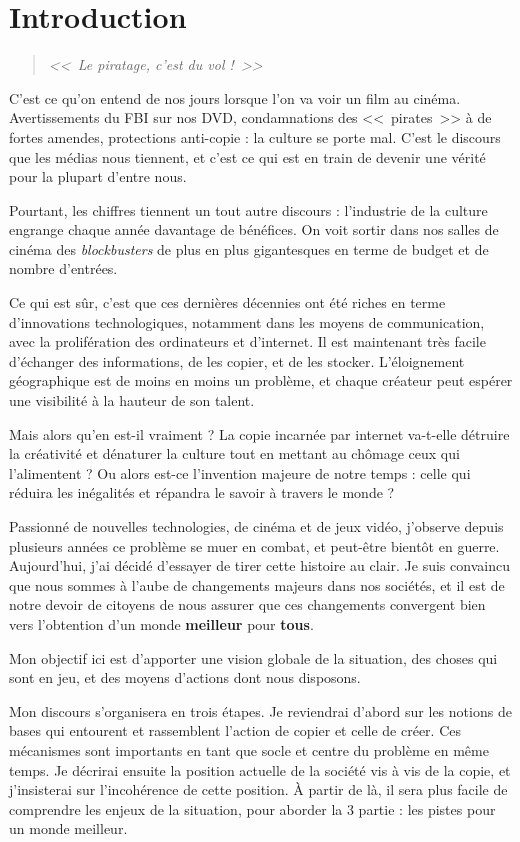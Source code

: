 \chapter*{Introduction}

\begin{quote}
{\Large \textit{<<~Le piratage, c'est du vol !~>>}}
\end{quote}

C'est ce qu'on entend de nos jours lorsque l'on va voir un film au cinéma. Avertissements du FBI sur nos DVD, condamnations des <<~pirates~>> à de fortes amendes, protections anti-copie : la culture se porte mal. C'est le discours que les médias nous tiennent, et c'est ce qui est en train de devenir une vérité pour la plupart d'entre nous.

Pourtant, les chiffres tiennent un tout autre discours : l'industrie de la culture engrange chaque année davantage de bénéfices. On voit sortir dans nos salles de cinéma des \textit{blockbusters} de plus en plus gigantesques en terme de budget et de nombre d'entrées.

Ce qui est sûr, c'est que ces dernières décennies ont été riches en terme d'innovations technologiques, notamment dans les moyens de communication, avec la prolifération des ordinateurs et d'internet. Il est maintenant très facile d'échanger des informations, de les copier, et de les stocker. L'éloignement géographique est de moins en moins un problème, et chaque créateur peut espérer une visibilité à la hauteur de son talent.

Mais alors qu'en est-il vraiment ? La copie incarnée par internet va-t-elle détruire la créativité et dénaturer la culture tout en mettant au chômage ceux qui l'alimentent ? Ou alors est-ce l'invention majeure de notre temps : celle qui réduira les inégalités et répandra le savoir à travers le monde ?

Passionné de nouvelles technologies, de cinéma et de jeux vidéo, j'observe depuis plusieurs années ce problème se muer en combat, et peut-être bientôt en guerre. Aujourd'hui, j'ai décidé d'essayer de tirer cette histoire au clair. Je suis convaincu que nous sommes à l'aube de changements majeurs dans nos sociétés, et il est de notre devoir de citoyens de nous assurer que ces changements convergent bien vers l'obtention d'un monde \textbf{meilleur} pour \textbf{tous}.

Mon objectif ici est d'apporter une vision globale de la situation, des choses qui sont en jeu, et des moyens d'actions dont nous disposons.

Mon discours s'organisera en trois étapes. Je reviendrai d'abord sur les notions de bases qui entourent et rassemblent l'action de copier et celle de créer. Ces mécanismes sont importants en tant que socle et centre du problème en même temps. Je décrirai ensuite la position actuelle de la société vis à vis de la copie, et j'insisterai sur l'incohérence de cette position. À partir de là, il sera plus facile de comprendre les enjeux de la situation, pour aborder la 3\ieme{} partie : les pistes pour un monde meilleur.
